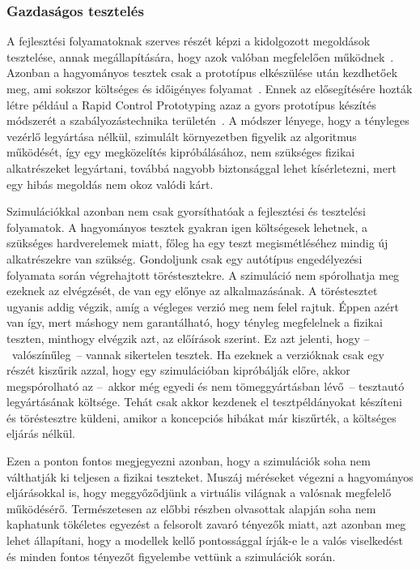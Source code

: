         \subsubsection{Gazdaságos tesztelés} \label{sec:gazdasagossag}
        A fejlesztési folyamatoknak szerves részét képzi a kidolgozott megoldások tesztelése, annak megállapítására, hogy azok valóban megfelelően működnek~\cite{Bajaj_2022}.
        Azonban a hagyományos tesztek csak a prototípus elkészülése után kezdhetőek meg, ami sokszor költséges és időigényes folyamat~\cite{Gianni2017}. Ennek az elősegítésére hozták létre például a Rapid Control Prototyping azaz a gyors prototípus készítés módszerét a szabályozástechnika területén~\cite{SpeedgoatGmbH}.
        A módszer lényege, hogy a tényleges vezérlő legyártása nélkül, szimulált környezetben figyelik az algoritmus működését, így egy megközelítés kipróbálásához, nem szükséges fizikai alkatrészeket legyártani, továbbá nagyobb biztonsággal lehet kísérletezni, mert egy hibás megoldás nem okoz valódi kárt.
        
        Szimulációkkal azonban nem csak gyorsíthatóak a fejlesztési és tesztelési folyamatok. A hagyományos tesztek gyakran igen költségesek lehetnek, a szükséges hardverelemek miatt, főleg ha egy teszt megismétléséhez mindig új alkatrészekre van szükség.
        Gondoljunk csak egy autótípus engedélyezési folyamata során végrehajtott töréstesztekre.
        A szimuláció nem spórolhatja meg ezeknek az elvégzését, de van egy előnye az alkalmazásának.
        A töréstesztet ugyanis addig végzik, amíg a végleges verzió meg nem felel rajtuk. Éppen azért van így, mert máshogy nem garantálható, hogy tényleg megfelelnek a fizikai teszten, minthogy elvégzik azt, az előírások szerint.
        Ez azt jelenti, hogy --~valószínűleg~-- vannak sikertelen tesztek. Ha ezeknek a verzióknak csak egy részét kiszűrik azzal, hogy egy szimulációban kipróbálják előre, akkor megspórolható az --~akkor még egyedi és nem tömeggyártásban lévő~-- tesztautó legyártásának költsége.
        Tehát csak akkor kezdenek el tesztpéldányokat készíteni és töréstesztre küldeni, amikor a koncepciós hibákat már kiszűrték, a költséges eljárás nélkül.
        
        Ezen a ponton fontos megjegyezni azonban, hogy a szimulációk soha nem válthatják ki teljesen a fizikai teszteket.
        Muszáj méréseket végezni a hagyományos eljárásokkal is, hogy meggyőződjünk a virtuális világnak a valósnak megfelelő működésérő. Természetesen az előbbi részben olvasottak alapján soha nem kaphatunk tökéletes egyezést a felsorolt zavaró tényezők miatt, azt azonban meg lehet állapítani, hogy a modellek kellő pontossággal írják-e le a valós viselkedést és minden fontos tényezőt figyelembe vettünk a szimulációk során.
        
